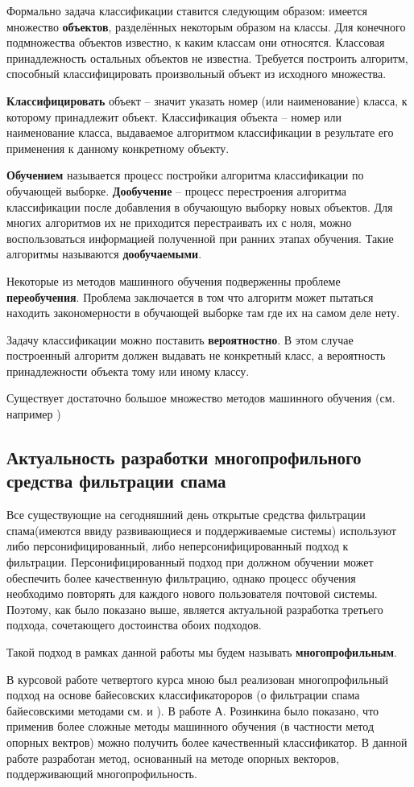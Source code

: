 Формально задача классификации ставится следующим образом: имеется множество \textbf{объектов}, разделённых некоторым образом на классы. Для конечного подмножества объектов известно, к каким классам они относятся. Классовая принадлежность остальных объектов не известна. Требуется построить алгоритм, способный классифицировать произвольный объект из исходного множества. 

\textbf{Классифицировать} объект – значит указать номер (или наименование) класса, к которому принадлежит объект. Классификация объекта – номер или  наименование класса, выдаваемое алгоритмом классификации в результате его применения к данному конкретному объекту.

\textbf{Обучением} называется процесс постройки алгоритма классификации по обучающей выборке. \textbf{Дообучение} – процесс перестроения алгоритма классификации после добавления в обучающую выборку новых объектов. Для многих алгоритмов их не приходится перестраивать их с ноля, можно воспользоваться информацией полученной при ранних этапах обучения. Такие алгоритмы называются \textbf{дообучаемыми}.

Некоторые из методов машинного обучения подверженны проблеме \textbf{переобучения}. Проблема заключается в том что алгоритм может пытаться находить закономерности в обучающей выборке там где их на самом деле нету.

Задачу классификации можно поставить \textbf{вероятностно}. В этом случае построенный  алгоритм должен выдавать не конкретный класс, а вероятность принадлежности объекта тому или иному классу.

Существует достаточно большое множество методов машинного обучения (см. например \cite{VORONCOV}) 

\subsection{Актуальность разработки многопрофильного средства фильтрации спама}

Все существующие на сегодняшний день открытые средства фильтрации спама(имеются ввиду развивающиеся и поддерживаемые системы) используют либо персонифицированный, либо неперсонифицированный подход к фильтрации. Персонифицированный подход при должном обучении может обеспечить более качественную фильтрацию, однако процесс обучения необходимо повторять для каждого нового пользователя почтовой системы. 
Поэтому, как было показано выше, является актуальной разработка третьего подхода, сочетающего достоинства обоих подходов. 

Такой подход в рамках данной работы мы будем называть \textbf{многопрофильным}. 

В курсовой работе четвертого курса \cite{PETROV10} мною был реализован многопрофильный подход на основе байесовских классификатороров (о фильтрации спама байесовскими методами см. \cite{PLANFORSPAM} и \cite{ROBINSON}). В работе А. Розинкина\cite{ROZ} было показано, что применив более сложные методы машинного обучения (в частности метод опорных вектров) можно получить более качественный классификатор. В данной работе разработан метод, основанный на методе опорных векторов, поддерживающий многопрофильность.

